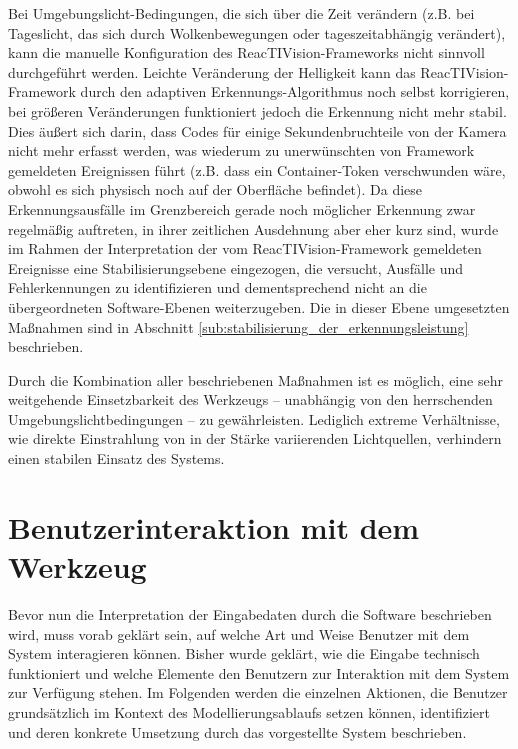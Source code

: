 Bei Umgebungslicht-Bedingungen, die sich über die Zeit verändern (z.B. bei Tageslicht, das sich durch Wolkenbewegungen oder tageszeitabhängig verändert), kann die manuelle Konfiguration des ReacTIVision-Frameworks nicht sinnvoll durchgeführt werden. Leichte Veränderung der Helligkeit kann das ReacTIVision-Framework durch den adaptiven Erkennungs-Algorithmus noch selbst korrigieren, bei größeren Veränderungen funktioniert jedoch die Erkennung nicht mehr stabil. Dies äußert sich darin, dass Codes für einige Sekundenbruchteile von der Kamera nicht mehr erfasst werden, was wiederum zu unerwünschten von Framework gemeldeten Ereignissen führt (z.B. dass ein Container-Token verschwunden wäre, obwohl es sich physisch noch auf der Oberfläche befindet). Da diese Erkennungsausfälle im Grenzbereich gerade noch möglicher Erkennung zwar regelmäßig auftreten, in ihrer zeitlichen Ausdehnung aber eher kurz sind, wurde im Rahmen der Interpretation der vom ReacTIVision-Framework gemeldeten Ereignisse eine Stabilisierungsebene eingezogen, die versucht, Ausfälle und Fehlerkennungen zu identifizieren und dementsprechend nicht an die übergeordneten Software-Ebenen weiterzugeben. Die in dieser Ebene umgesetzten Maßnahmen sind in Abschnitt \ref{sub:stabilisierung_der_erkennungsleistung} beschrieben.

Durch die Kombination aller beschriebenen Maßnahmen ist es möglich, eine sehr weitgehende Einsetzbarkeit des Werkzeugs -- unabhängig von den herrschenden Umgebungslichtbedingungen -- zu gewährleisten. Lediglich  extreme Verhältnisse, wie direkte Einstrahlung von in der Stärke variierenden Lichtquellen, verhindern einen stabilen Einsatz des Systems.  


\section{Benutzerinteraktion mit dem Werkzeug} %
\label{sec:benutzerinteraktion_mit_dem_werkzeug}

Bevor nun die Interpretation der Eingabedaten durch die Software beschrieben wird, muss vorab geklärt sein, auf welche Art und Weise Benutzer mit dem System interagieren können. Bisher wurde geklärt, wie die Eingabe technisch funktioniert und welche Elemente den Benutzern zur Interaktion mit dem System zur Verfügung stehen. Im Folgenden werden die einzelnen Aktionen, die Benutzer grundsätzlich im Kontext des Modellierungsablaufs setzen können, identifiziert und deren konkrete Umsetzung durch das vorgestellte System beschrieben.

